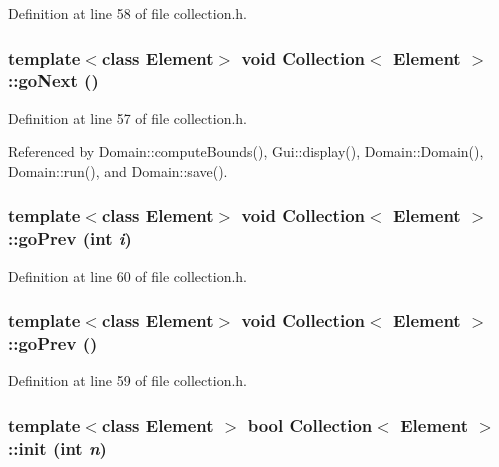 Definition at line 58 of file collection.h.\hypertarget{classCollection_71ab918a6e6938f9e8bf1ce9ac36c25a}{
\subsubsection[{goNext}]{\setlength{\rightskip}{0pt plus 5cm}template$<$class Element$>$ void {\bf Collection}$<$ Element $>$::goNext ()}}
\label{classCollection_71ab918a6e6938f9e8bf1ce9ac36c25a}




Definition at line 57 of file collection.h.

Referenced by Domain::computeBounds(), Gui::display(), Domain::Domain(), Domain::run(), and Domain::save().\hypertarget{classCollection_c3d18037a745f47a28b2ea652fdc564f}{
\subsubsection[{goPrev}]{\setlength{\rightskip}{0pt plus 5cm}template$<$class Element$>$ void {\bf Collection}$<$ Element $>$::goPrev (int {\em i})}}
\label{classCollection_c3d18037a745f47a28b2ea652fdc564f}




Definition at line 60 of file collection.h.\hypertarget{classCollection_ba0170475fe3ff507bbcd8dc48a8f658}{
\subsubsection[{goPrev}]{\setlength{\rightskip}{0pt plus 5cm}template$<$class Element$>$ void {\bf Collection}$<$ Element $>$::goPrev ()}}
\label{classCollection_ba0170475fe3ff507bbcd8dc48a8f658}




Definition at line 59 of file collection.h.\hypertarget{classCollection_8196ceec2c64fa65f139fac1f9c30b85}{
\subsubsection[{init}]{\setlength{\rightskip}{0pt plus 5cm}template$<$class Element $>$ bool {\bf Collection}$<$ Element $>$::init (int {\em n})}}
\label{classCollection_8196ceec2c64fa65f139fac1f9c30b85}




